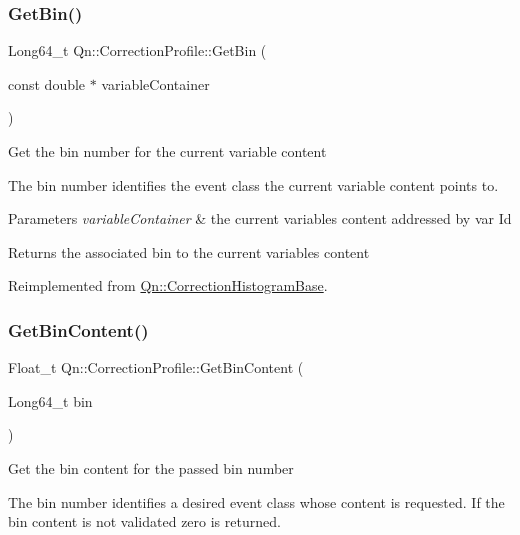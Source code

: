 \subsubsection{\texorpdfstring{Get\+Bin()}{GetBin()}}
{\footnotesize\ttfamily Long64\+\_\+t Qn\+::\+Correction\+Profile\+::\+Get\+Bin (\begin{DoxyParamCaption}\item[{const double $\ast$}]{variable\+Container }\end{DoxyParamCaption})\hspace{0.3cm}{\ttfamily [virtual]}}

Get the bin number for the current variable content

The bin number identifies the event class the current variable content points to.


\begin{DoxyParams}{Parameters}
{\em variable\+Container} & the current variables content addressed by var Id \\
\hline
\end{DoxyParams}
\begin{DoxyReturn}{Returns}
the associated bin to the current variables content 
\end{DoxyReturn}


Reimplemented from \mbox{\hyperlink{classQn_1_1CorrectionHistogramBase_ab1f64550f4e1812864da6f9f6ea565e6}{Qn\+::\+Correction\+Histogram\+Base}}.

\mbox{\label{classQn_1_1CorrectionProfile_ad6a10a5dd59ba94e9853699e63d902d4}} 
\subsubsection{\texorpdfstring{Get\+Bin\+Content()}{GetBinContent()}}
{\footnotesize\ttfamily Float\+\_\+t Qn\+::\+Correction\+Profile\+::\+Get\+Bin\+Content (\begin{DoxyParamCaption}\item[{Long64\+\_\+t}]{bin }\end{DoxyParamCaption})\hspace{0.3cm}{\ttfamily [virtual]}}

Get the bin content for the passed bin number

The bin number identifies a desired event class whose content is requested. If the bin content is not validated zero is returned.



